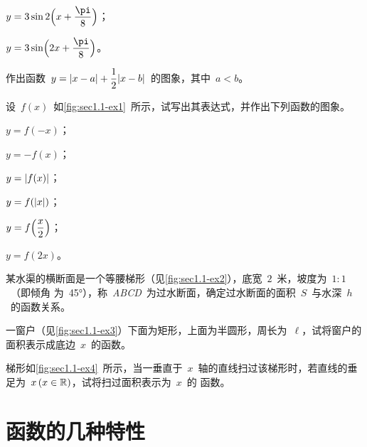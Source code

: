 \begin{exercise}
\begin{exlistcols}[3]
  \item $y=3\sin2\Paren[\Big]{x+\dfrac\pi8}$；
  \item $y=3\sin\Paren[\Big]{2x+\dfrac\pi8}$。
\end{exlistcols}
\item 作出函数~$y=\abs{x-a}+\dfrac12\abs{x-b}$~的图象，其中~$a<b$。
\item 设~$f(x)$~如\ref{fig:sec1.1-ex1}~所示，试写出其表达式，并作出下列函数的图象。
\begin{exlistcols}[3]
  \item $y=f(-x)$；
  \item $y=-f(x)$；
  \item $y=\abs{f(x)}$；
  \item $y=f(\abs x)$；
  \item $y=f\Paren[\Big]{\dfrac x2}$；
  \item $y=f(2x)$。
\end{exlistcols}
\item 某水渠的横断面是一个等腰梯形（见\ref{fig:sec1.1-ex2}），底宽~$2$~米，坡度为~$1:1$~（即倾角
为~\ang{45}），称~\textit{ABCD}~为过水断面，确定过水断面的面积~$S$~与水深~$h$~的函数关系。
\begin{figure}
\begin{floatrow}[2]
\figurebox{\caption{}\label{fig:sec1.1-ex1}}
          {\somefigure}
\figurebox{\caption{}\label{fig:sec1.1-ex2}}
          {\somefigure}
\end{floatrow}
\end{figure}
\item 一窗户（见\ref{fig:sec1.1-ex3}）下面为矩形，上面为半圆形，周长为~$\ell$，试将窗户的面积表示成底边~$x$~的函数。
\begin{figure}
\begin{floatrow}[2]
\figurebox{\caption{}\label{fig:sec1.1-ex3}}
          {\somefigure}
\figurebox{\caption{}\label{fig:sec1.1-ex4}}
          {\somefigure}
\end{floatrow}
\end{figure}
\item 梯形如\ref{fig:sec1.1-ex4}~所示，当一垂直于~$x$~轴的直线扫过该梯形时，若直线的垂足为~$x\,(x\in\FR)$，试将扫过面积表示为~$x$~的
函数。
\end{exercise}



\section{函数的几种特性}

